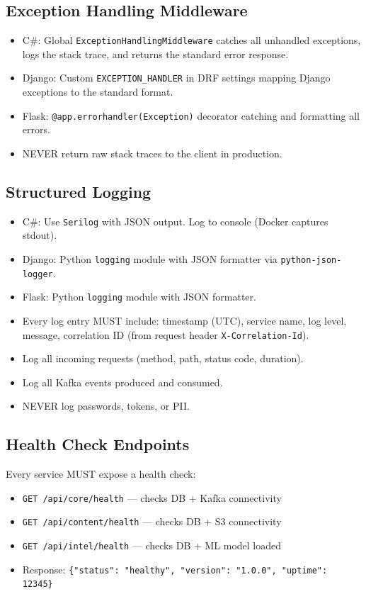 \documentclass[12pt,letterpaper]{article}
\begin{document}
\subsection{Exception Handling Middleware}
\begin{itemize}
  \item C\#: Global \texttt{ExceptionHandlingMiddleware} catches all unhandled exceptions, logs the stack trace, and returns the standard error response.
  \item Django: Custom \texttt{EXCEPTION\_HANDLER} in DRF settings mapping Django exceptions to the standard format.
  \item Flask: \texttt{@app.errorhandler(Exception)} decorator catching and formatting all errors.
  \item NEVER return raw stack traces to the client in production.
\end{itemize}

\subsection{Structured Logging}
\begin{itemize}
  \item C\#: Use \texttt{Serilog} with JSON output. Log to console (Docker captures stdout).
  \item Django: Python \texttt{logging} module with JSON formatter via \texttt{python-json-logger}.
  \item Flask: Python \texttt{logging} module with JSON formatter.
  \item Every log entry MUST include: timestamp (UTC), service name, log level, message, correlation ID (from request header \texttt{X-Correlation-Id}).
  \item Log all incoming requests (method, path, status code, duration).
  \item Log all Kafka events produced and consumed.
  \item NEVER log passwords, tokens, or PII.
\end{itemize}

\subsection{Health Check Endpoints}
Every service MUST expose a health check:
\begin{itemize}
  \item \texttt{GET /api/core/health} --- checks DB + Kafka connectivity
  \item \texttt{GET /api/content/health} --- checks DB + S3 connectivity
  \item \texttt{GET /api/intel/health} --- checks DB + ML model loaded
  \item Response: \texttt{\{"status": "healthy", "version": "1.0.0", "uptime": 12345\}}
\end{itemize}
\end{document}
